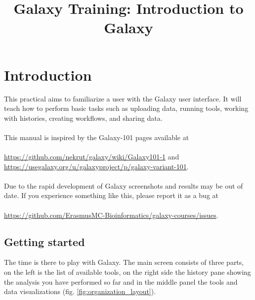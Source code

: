 \documentclass[11pt,a4paper]{article}
\begin{document}
\title{ \textbf{\textit{\institute}\text{ }Galaxy Training: Introduction to Galaxy} }

\author{ \authors }
\maketitle



\section*{Introduction}
This practical aims to familiarize a user with the Galaxy user interface. It will teach how to perform basic tasks such as uploading data, running tools, working with histories, creating workflows, and sharing data. \\
\ \\
This manual is inspired by the Galaxy-101 pages available at \\
\ \\
\url{https://github.com/nekrut/galaxy/wiki/Galaxy101-1} and \\
\url{https://usegalaxy.org/u/galaxyproject/p/galaxy-variant-101}. \\
\ \\
Due to the rapid development of Galaxy screenshots and results may be out of date. If you experience something like this, please report it as a bug at \\
\ \\
\url{https://github.com/ErasmusMC-Bioinformatics/galaxy-courses/issues}.


\subsection*{Getting started}
The time is there to play with Galaxy. The main screen consists of three parts, on the left is the list of available tools, on the right side the history pane showing the analysis you have performed so far and in the middle panel the tools and data visualizations (fig. \ref{fig:organization_layout}).
\end{document}
